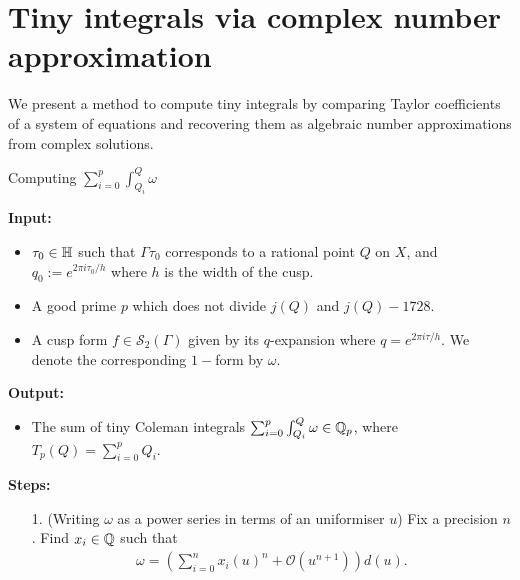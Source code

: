 \section{Tiny integrals via complex number approximation}

We present a method to compute tiny integrals by comparing Taylor coefficients of a system of equations and recovering them as algebraic number approximations from complex solutions.

\begin{algorithm}Computing $\sum_{i=0}^{p}\int^Q_{Q_i} \omega$\label{alg:tiny_integral}

\textbf{Input:}
\begin{itemize}
    \item $\tau_0 \in \mathbb{H}$ such that $\Gamma\tau_0$ corresponds to a rational point $Q$ on $X$, and $q_0 := e^{2\pi i \tau_0/h}$ where $h$ is the width of the cusp.
    \item A good prime $p$ which does not divide $j(Q)$ and $j(Q)-1728$. 
    \item A cusp form $f\in \mathcal{S}_2(\Gamma)$ given by its $q$-expansion where $q = e^{2\pi i \tau/h}$. We denote the corresponding $1-$form by $\omega$.
    



\end{itemize}

\textbf{Output:}
\begin{itemize}
    \item The sum of tiny Coleman integrals $\sum^p_{i=0}\int^Q_{Q_i} \omega \in \mathbb{Q}_p$, where $T_p(Q) = \sum_{i=0}^p Q_i$.
\end{itemize}

\textbf{Steps:}
\begin{enumerate}
\item[1.] \label{algstep:tiny_1} (Writing $\omega$ as a power series in terms of an uniformiser $u$) Fix a precision $n$. Find $x_i \in \mathbb{Q}$ such that
\begin{align} \label{eq:omega_j_exp}
    \omega = (\sum_{i=0}^n x_i(u)^n + \mathcal{O}(u^{n+1}))d(u).
\end{align}


\end{enumerate}
\end{algorithm}
